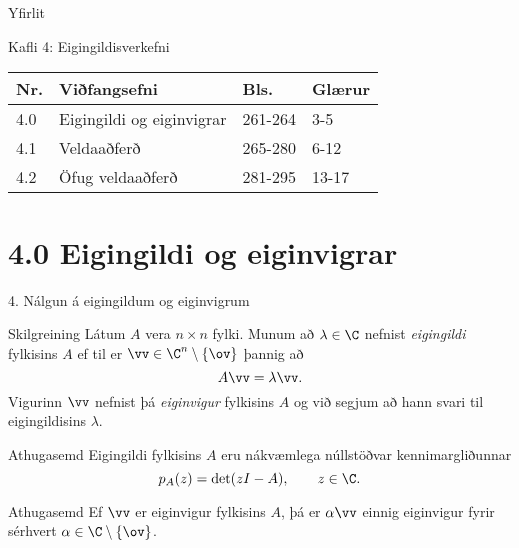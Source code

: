 \date{10.~apríl 2015}



\begin{frame}
	\maketitle
\end{frame}

\section*{}
\begin{frame}{Yfirlit}
\begin{block}{Kafli 4: Eigingildisverkefni}
\begin{center}
\begin{tabular}{|l|l|l|l|}\hline
Nr. &Viðfangsefni & Bls. & Glærur\\
\hline
4.0 & Eigingildi og eiginvigrar & 261-264 & 3-5\\
4.1 & Veldaaðferð & 265-280 & 6-12\\
4.2 & Öfug veldaaðferð & 281-295 & 13-17\\
\hline
\end{tabular}
\end{center}

\end{block}
\end{frame}

\section*{4.0 Eigingildi og eiginvigrar}

\begin{frame}{4. Nálgun á eigingildum og eiginvigrum} 
\begin{block}{Skilgreining}
Látum $A$ vera $n\times n$ fylki.  Munum að  $\lambda\in \C$ nefnist
{\it eigingildi} fylkisins $A$ ef til er $\vv\in \C^n\setminus\{\ov\}$ 
þannig að 
$$
A\vv=\lambda\vv.
$$
\pause
Vigurinn $\vv$ nefnist þá {\it eiginvigur } fylkisins $A$ og við
segjum að hann svari til eigingildisins $\lambda$.
\end{block}

\pause
\begin{block}{Athugasemd}
Eigingildi fylkisins $A$ eru nákvæmlega núllstöðvar kennimargliðunnar
$$
p_A(z)=\det(zI-A), \qquad z\in \C.
$$
\end{block}
\pause

\begin{block}{Athugasemd}
Ef $\vv$ er eiginvigur fylkisins $A$, þá er $\alpha \vv$ einnig
eiginvigur fyrir sérhvert $\alpha\in \C\setminus \{\ov\}$. 
\end{block}
\end{frame}


